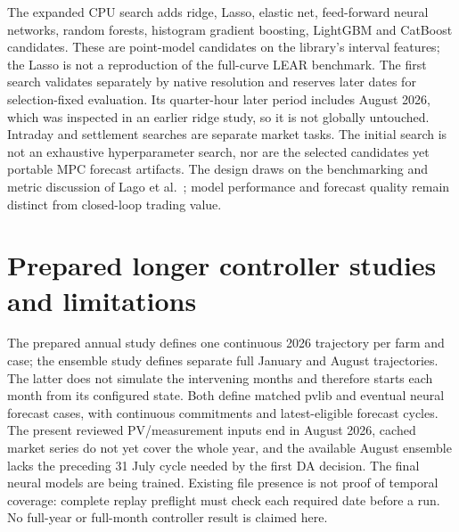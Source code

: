 \documentclass[11pt,a4paper]{article}
\begin{document}
The expanded CPU search adds ridge, Lasso, elastic net, feed-forward neural
networks, random forests, histogram gradient boosting, LightGBM and CatBoost
candidates. These are point-model candidates on the library's interval features;
the Lasso is not a reproduction of the full-curve LEAR benchmark. The first
search validates separately by native resolution and reserves later dates for
selection-fixed evaluation. Its quarter-hour later period includes August 2026,
which was inspected in an earlier ridge study, so it is not globally untouched.
Intraday and settlement searches are separate market tasks. The initial search
is not an exhaustive hyperparameter search, nor are the selected candidates yet
portable MPC forecast artifacts. The design draws on the benchmarking and
metric discussion of Lago et al.\ \cite{lago2021}; model performance and
forecast quality remain distinct from closed-loop trading value.

\section{Prepared longer controller studies and limitations}
The prepared annual study defines one continuous 2026 trajectory per farm and
case; the ensemble study defines separate full January and August trajectories.
The latter does not simulate the intervening months and therefore starts each
month from its configured state. Both define matched pvlib and eventual neural
forecast cases, with continuous commitments and latest-eligible forecast cycles.
The present reviewed PV/measurement inputs end in August 2026, cached market
series do not yet cover the whole year, and the available August ensemble lacks
the preceding 31 July cycle needed by the first DA decision. The final neural
models are being trained. Existing file presence is not proof of temporal
coverage: complete replay preflight must check each required date before a run.
No full-year or full-month controller result is claimed here.
\end{document}
